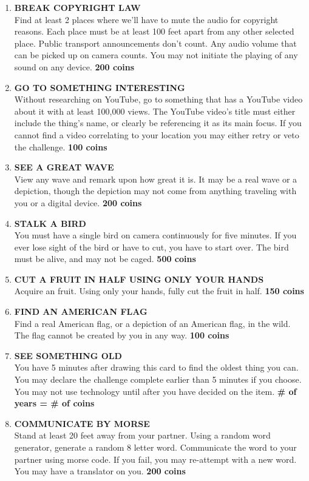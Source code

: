 \documentclass{article}
\begin{document}
\begin{enumerate}
    \item \textbf{BREAK COPYRIGHT LAW}\\ Find at least 2 places where we'll have to mute the audio for copyright reasons. Each place must be at least 100 feet apart from any other selected place. Public transport announcements don't count. Any audio volume that can be picked up on camera counts. You may not initiate the playing of any sound on any device. \textbf{200 coins}
    \item \textbf{GO TO SOMETHING INTERESTING} \\ Without researching on YouTube, go to something that has a YouTube video about it with at least 100,000 views. The YouTube video's title must either include the thing's name, or clearly be referencing it as its main focus. If you cannot find a video correlating to your location you may either retry or veto the challenge. \textbf{100 coins}
    \item \textbf{SEE A GREAT WAVE} \\ View any wave and remark upon how great it is. It may be a real wave or a depiction, though the depiction may not come from anything traveling with you or a digital device. \textbf{200 coins}
    \item \textbf{STALK A BIRD} \\ You must have a single bird on camera continuously for five minutes. If you ever lose sight of the bird or have to cut, you have to start over. The bird must be alive, and may not be caged. \textbf{500 coins}
    \item \textbf{CUT A FRUIT IN HALF USING ONLY YOUR HANDS} \\ Acquire an fruit. Using only your hands, fully cut the fruit in half. \textbf{150 coins}
    \item \textbf{FIND AN AMERICAN FLAG} \\
    Find a real American flag, or a depiction of an American flag, in the wild. The flag cannot be created by you in any way. \textbf{100 coins}
    \item \textbf{SEE SOMETHING OLD} \\ You have 5 minutes after drawing this card to find the oldest thing you can. You may declare the challenge complete earlier than 5 minutes if you choose. You may not use technology until after you have decided on the item. \textbf{\# of years = \# of coins}
    \item \textbf{COMMUNICATE BY MORSE} \\ Stand at least 20 feet away from your partner. Using a random word generator, generate a random 8 letter word. Communicate the word to your partner using morse code. If you fail, you may re-attempt with a new word. You may have a translator on you. \textbf{200 coins}

\end{enumerate}
\end{document}
